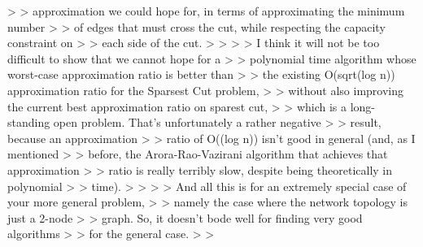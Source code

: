 > > approximation we could hope for, in terms of approximating the minimum number
> > of edges that must cross the cut, while respecting the capacity constraint on
> > each side of the cut.
> >
> > I think it will not be too difficult to show that we cannot hope for a
> > polynomial time algorithm whose worst-case approximation ratio is better than
> > the existing O(sqrt(log n)) approximation ratio for the Sparsest Cut problem,
> > without also improving the current best approximation ratio on sparest cut,
> > which is a long-standing open problem. That's unfortunately a rather negative
> > result, because an approximation
> > ratio of O(\sqrt(log n)) isn't good in general (and, as I mentioned
> > before, the Arora-Rao-Vazirani algorithm that achieves that approximation
> > ratio is really terribly slow, despite being theoretically in polynomial
> > time).
> >
> > And all this is for an extremely special case of your more general problem,
> > namely the case where the network topology is just a 2-node
> > graph.  So, it doesn't bode well for finding very good algorithms
> > for the general case.
> >